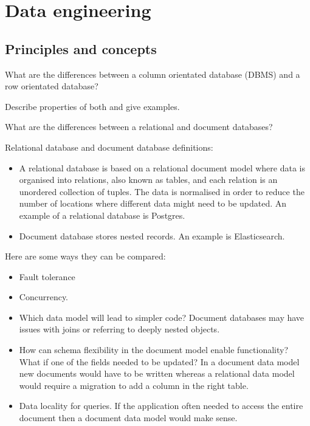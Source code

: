 \section{Data engineering}

\subsection{Principles and concepts}

\begin{questions}

\question What are the differences between a column orientated database (DBMS) and a row orientated database?
\begin{solution}
Describe properties of both and give examples.
\end{solution}

\question What are the differences between a relational and document databases?
\begin{solution}
Relational database and document database definitions:
\begin{itemize}
    \item A relational database is based on a relational document model where data is organised into relations, also known as tables, and each relation is an unordered collection of tuples. The data is normalised in order to reduce the number of locations where different data might need to be updated. An example of a relational database is Postgres.
    \item Document database stores nested records. An example is Elasticsearch.
\end{itemize}
Here are some ways they can be compared:
\begin{itemize}
    \item Fault tolerance
    \item Concurrency. 
    \item Which data model will lead to simpler code? Document databases may have issues with joins or referring to deeply nested objects.
    \item How can schema flexibility in the document model enable functionality? What if one of the fields needed to be updated? In a document data model new documents would have to be written whereas a relational data model would require a migration to add a column in the right table.
    \item Data locality for queries. If the application often needed to access the entire document then a document data model would make sense.
\end{itemize}
\cite[p.~38]{ddia}
\end{solution}


\end{questions}
